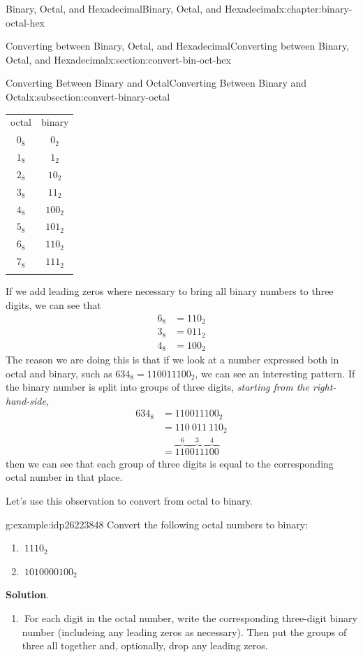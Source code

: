 \documentclass[twoside,10pt,]{book}
\newcommand{\blocktitlefont}{\relax}
\newcommand{\tabularfont}{\relax}
\numberwithin{equation}{section}
\newcommand{\hrulemedium}{\noalign{\hrule height 0.07em}}
\newcommand{\hrulethick} {\noalign{\hrule height 0.11em}}
\newcommand{\amp}{&}
\begin{document}
\begin{chapterptx}{Binary, Octal, and Hexadecimal}{}{Binary, Octal, and Hexadecimal}{}{}{x:chapter:binary-octal-hex}
\begin{sectionptx}{Converting between Binary, Octal, and Hexadecimal}{}{Converting between Binary, Octal, and Hexadecimal}{}{}{x:section:convert-bin-oct-hex}
\begin{subsectionptx}{Converting Between Binary and Octal}{}{Converting Between Binary and Octal}{}{}{x:subsection:convert-binary-octal}
\begin{center}
{\tabularfont%
\begin{tabular}{cc}\hrulethick
octal&binary\tabularnewline\hrulemedium
\(0_8\)&\(0_2\)\tabularnewline[0pt]
\(1_8\)&\(1_2\)\tabularnewline[0pt]
\(2_8\)&\(10_2\)\tabularnewline[0pt]
\(3_8\)&\(11_2\)\tabularnewline[0pt]
\(4_8\)&\(100_2\)\tabularnewline[0pt]
\(5_8\)&\(101_2\)\tabularnewline[0pt]
\(6_8\)&\(110_2\)\tabularnewline[0pt]
\(7_8\)&\(111_2\)\tabularnewline\hrulethick
\end{tabular}
}%
\end{center}%
%
\par
If we add leading zeros where necessary to bring all binary numbers to three digits, we can see that%
\begin{align*}
6_8 \amp = 110_2\\
3_8 \amp = 011_2\\
4_8 \amp = 100_2
\end{align*}
The reason we are doing this is that if we look at a number expressed both in octal and binary, such as \(634_8=110011100_2\), we can see an interesting pattern.  If the binary number is split into groups of three digits, \emph{starting from the right-hand-side},%
\begin{align*}
634_8 \amp = 110011100_2\\
\amp = 110\ 011\ 110_2\\
\amp = \overbrace{110}^{6}\overbrace{011}^{3}\overbrace{100}^{4}
\end{align*}
then we can see that each group of three digits is equal to the corresponding octal number in that place.%
\par
Let's use this observation to convert from octal to binary.  \begin{example}{}{g:example:idp26223848}%
Convert the following octal numbers to binary: %
\begin{enumerate}
\item{}\(\displaystyle \ 1110_2\)%
\item{}\(\displaystyle \ 1010000100_2\)%
\end{enumerate}
\par\smallskip%
\noindent\textbf{\blocktitlefont Solution}.\label{g:solution:idp26231272}{}\hypertarget{g:solution:idp26231272}{}\quad{}%
\begin{enumerate}
\item{}\(\ \)For each digit in the octal number, write the corresponding three-digit binary number (includeing any leading zeros as necessary).  Then put the groups of three all together and, optionally, drop any leading zeros.%

\end{enumerate}
\end{example}
\end{subsectionptx}
\end{sectionptx}
\end{chapterptx}
\end{document}
